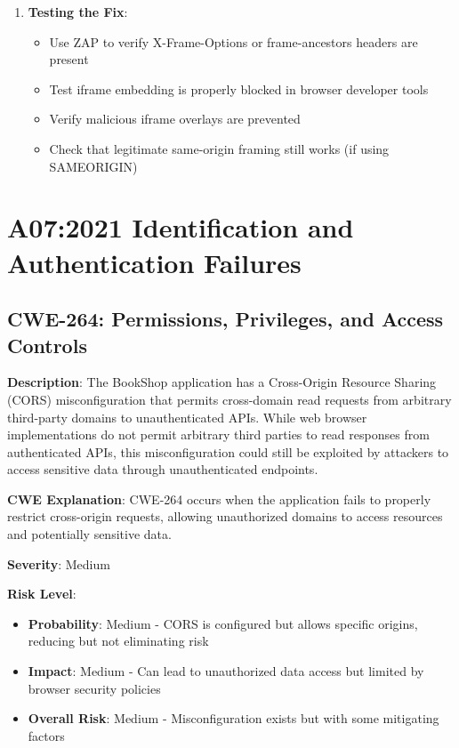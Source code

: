 \documentclass[]{UCD_CS_FYP_Report}
\begin{document}
\begin{enumerate}
    \item \textbf{Testing the Fix}:
    \begin{itemize}
        \item Use ZAP to verify X-Frame-Options or frame-ancestors headers are present
        \item Test iframe embedding is properly blocked in browser developer tools
        \item Verify malicious iframe overlays are prevented
        \item Check that legitimate same-origin framing still works (if using SAMEORIGIN)
    \end{itemize}
\end{enumerate}

\chapter{A07:2021 Identification and Authentication Failures}

\section{CWE-264: Permissions, Privileges, and Access Controls}

\textbf{Description}: The BookShop application has a Cross-Origin Resource Sharing (CORS) misconfiguration that permits cross-domain read requests from arbitrary third-party domains to unauthenticated APIs. While web browser implementations do not permit arbitrary third parties to read responses from authenticated APIs, this misconfiguration could still be exploited by attackers to access sensitive data through unauthenticated endpoints.

\textbf{CWE Explanation}: CWE-264 occurs when the application fails to properly restrict cross-origin requests, allowing unauthorized domains to access resources and potentially sensitive data.

\textbf{Severity}: Medium

\textbf{Risk Level}: 
\begin{itemize}
    \item \textbf{Probability}: Medium - CORS is configured but allows specific origins, reducing but not eliminating risk
    \item \textbf{Impact}: Medium - Can lead to unauthorized data access but limited by browser security policies
    \item \textbf{Overall Risk}: Medium - Misconfiguration exists but with some mitigating factors
\end{itemize}
\end{document}
